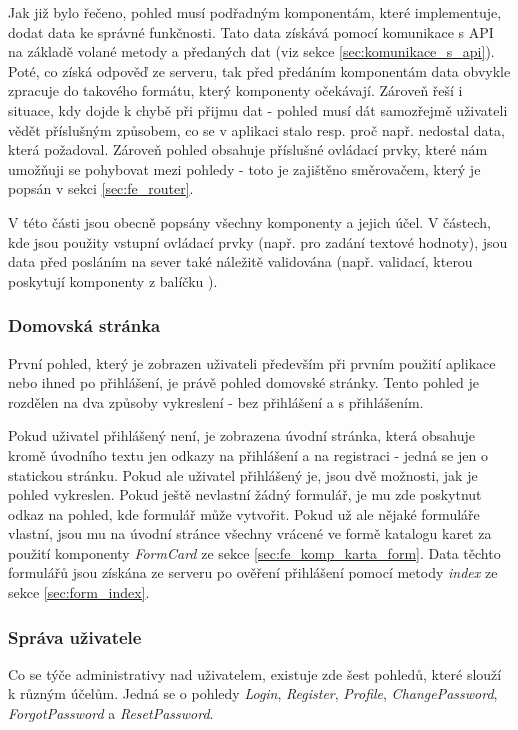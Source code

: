 	Jak již bylo řečeno, pohled musí podřadným komponentám, které implementuje, dodat data ke správné funkčnosti. Tato data získává pomocí komunikace s API na základě volané metody a předaných dat (viz sekce \ref{sec:komunikace_s_api}). Poté, co získá odpověď ze serveru, tak před předáním komponentám data obvykle zpracuje do takového formátu, který komponenty očekávají. Zároveň řeší i situace, kdy dojde k chybě při přijmu dat - pohled musí dát samozřejmě uživateli vědět příslušným způsobem, co se v aplikaci stalo resp. proč např. nedostal data, která požadoval. Zároveň pohled obsahuje příslušné ovládací prvky, které nám umožňuji se pohybovat mezi pohledy - toto je zajištěno směrovačem, který je popsán v sekci \ref{sec:fe_router}.
	
	V této části jsou obecně popsány všechny komponenty a jejich účel. V částech, kde jsou použity vstupní ovládací prvky (např. pro zadání textové hodnoty), jsou data před posláním na sever také náležitě validována (např. validací, kterou poskytují komponenty z balíčku ). %
		
		\subsubsection{Domovská stránka} %
		První pohled, který je zobrazen uživateli především při prvním použití aplikace nebo ihned po přihlášení, je právě pohled domovské stránky. Tento pohled je rozdělen na dva způsoby vykreslení - bez přihlášení a s přihlášením.
		
		Pokud uživatel přihlášený není, je zobrazena úvodní stránka, která obsahuje kromě úvodního textu jen odkazy na přihlášení a na registraci - jedná se jen o statickou stránku. Pokud ale uživatel přihlášený je, jsou dvě možnosti, jak je pohled vykreslen. Pokud ještě nevlastní žádný formulář, je mu zde poskytnut odkaz na pohled, kde formulář může vytvořit. Pokud už ale nějaké formuláře vlastní, jsou mu na úvodní stránce všechny vrácené ve formě katalogu karet za použití komponenty \textit{FormCard} ze sekce \ref{sec:fe_komp_karta_form}. Data těchto formulářů jsou získána ze serveru po ověření přihlášení pomocí metody \textit{index} ze sekce \ref{sec:form_index}.
	
		\subsubsection{Správa uživatele} %
		Co se týče administrativy nad uživatelem, existuje zde šest pohledů, které slouží k různým účelům. Jedná se o pohledy \textit{Login}, \textit{Register}, \textit{Profile}, \textit{ChangePassword}, \textit{ForgotPassword} a \textit{ResetPassword}.
		

